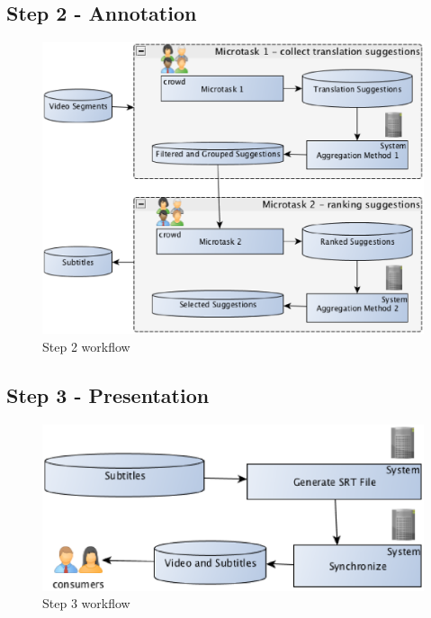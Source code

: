 \subsection{Step 2 - Annotation}

\begin{figure}[H]
	\centerline{\includegraphics[scale=0.4] {figure/annotation-workflow}}
	\caption{Step 2 workflow}
	\label{annotation}
\end{figure}

\subsection{Step 3 - Presentation}

\begin{figure}[H]
	\centerline{\includegraphics[scale=0.4] {figure/presentation-workflow}}
	\caption{Step 3 workflow}
	\label{presentation}
\end{figure}